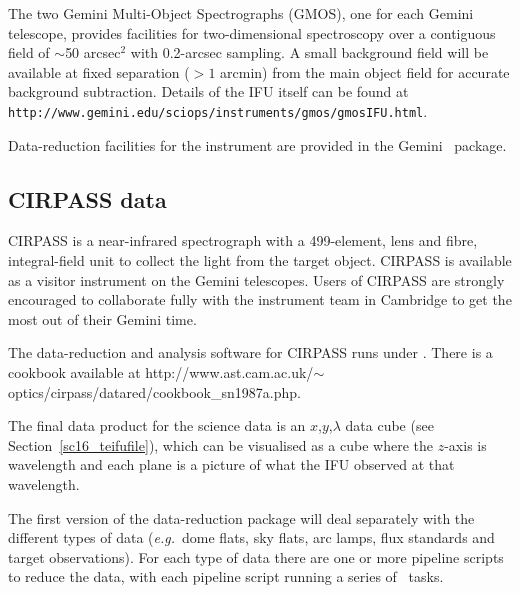 \documentclass[twoside,11pt]{article}
\newcommand{\htmladdnormallink}[2]{#1}
\newcommand{\htmlref}[2]{#1}
\newcommand{\xlabel}[1]{}
\newcommand{\latex}[1]{#1}
\begin{document}
The two Gemini Multi-Object Spectrographs
(\htmladdnormallink{GMOS}{http://www.gemini.edu/sciops/instruments/gmos/gmosIndex.html}),
one for each Gemini telescope, provides facilities for two-dimensional
spectroscopy over a contiguous field of $\sim$50 arcsec$^2$ with
0.2-arcsec sampling.  A small background field will be available at
fixed separation ($>1$ arcmin) from the main object field for accurate
background subtraction.  Details of the IFU itself can be found at
\htmladdnormallink{{\tt
http://www.gemini.edu/sciops/instruments/gmos/gmosIFU.html}}{http://www.gemini.edu/sciops/instruments/gmos/gmosIFU.html}.

\htmladdnormallink{Data-reduction
facilities}{http://www.gemini.edu/sciops/instruments/gmos/gmosDataRed.html}
for the instrument are provided in the Gemini \IRAFref\ package.

\subsection{\xlabel{sc16_cirpass}CIRPASS data\label{sc16_cirpass}}

\htmladdnormallink{CIRPASS}{http://www.ast.cam.ac.uk/~optics/cirpass/}
is a near-infrared spectrograph with a 499-element, lens and fibre,
integral-field unit to collect the light from the target object.
CIRPASS is available as a visitor instrument on the Gemini telescopes.
Users of CIRPASS are strongly encouraged to collaborate fully with the
instrument team in Cambridge to get the most out of their Gemini time.

The \htmladdnormallink{data-reduction and analysis software for
CIRPASS}{http://www.ast.cam.ac.uk/~optics/cirpass/docs/install_cirp_software.html}
runs under \IRAFref.  There is a 
\htmladdnormallink{cookbook}{http://www.ast.cam.ac.uk/~optics/cirpass/datared/cookbook_sn1987a.php}
available\latex{ at
http://www.ast.cam.ac.uk/$\sim$optics/cirpass/datared/cookbook\_sn1987a.php}.


The final data product for the science data is an $x$,$y$,$\lambda$ 
\htmlref{data cube}{sc16_teifufile}\latex{ (see
Section~\ref{sc16_teifufile})}, which can be visualised as a
cube where the $z$-axis is wavelength and each plane is a picture of
what the IFU observed at that wavelength.

The first version of the \htmladdnormallink{data-reduction
package}{http://www.ast.cam.ac.uk/~optics/cirpass/docs/soft_spec.html}
will deal separately with the different types of data (\emph{e.g.}\
dome flats, sky flats, arc lamps, flux standards and target
observations).  For each type of data there are one or more pipeline
scripts to reduce the data, with each pipeline script running a series
of \IRAF\ tasks.
\end{document}
